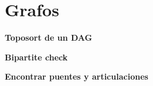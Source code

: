 \section{Grafos}
    \textbf{Toposort de un DAG}
    

    \textbf{Bipartite check}
    

    \textbf{Encontrar puentes y articulaciones}
    